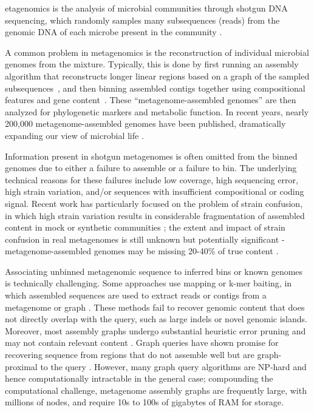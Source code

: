 etagenomics is the analysis of microbial communities through shotgun
DNA sequencing, which randomly samples many subsequences (reads)
from the genomic DNA of each microbe present in the community \cite{Quince2017}.

A common problem in metagenomics is the reconstruction of
individual microbial genomes from the mixture.
Typically, this is
done by first running an assembly algorithm that reconstructs
longer linear regions based on a graph of the sampled
subsequences~\cite{pell2012scaling}, and then binning assembled
contigs together using compositional features and gene content~\cite{laczny2017busybee,lin2016accurate}.  These
``metagenome-assembled genomes'' are then
analyzed for phylogenetic markers and metabolic function. In recent years,
nearly 200,000 metagenome-assembled genomes have been published,
dramatically expanding our view of microbial life
\cite{Parks2017,Tully2018,Stewart2018,Delmont2018,Hug2016,Pasolli2019}.

Information present in shotgun metagenomes is often omitted from the
binned genomes due to either a failure to
assemble \cite{CAMI,Awad155358} or a failure to bin.  The underlying
technical reasons for these failures include low coverage, high
sequencing error, high strain variation, and/or sequences with
insufficient compositional or coding signal.  Recent work has
particularly focused on the problem of strain confusion, in which high
strain variation results in considerable fragmentation of assembled
content in mock or synthetic communities \cite{CAMI,Awad155358}; the
extent and impact of strain confusion in real metagenomes is still
unknown but potentially significant - metagenome-assembled genomes may be missing 20-40\% of true content \cite{brownstrain,Brito2016,baltic}.

Associating unbinned metagenomic sequence to inferred bins or known
genomes is technically challenging.  Some approaches use mapping or
k-mer baiting, in which assembled sequences are used to extract reads
or contigs from a metagenome or
graph \cite{desman,Nayfach2016,ekg,mspminer,Petersen2016}.
These
methods fail to recover genomic content that does not directly overlap
with the query, such as large indels or novel genomic
islands. Moreover, most assembly graphs undergo substantial heuristic
error pruning and may not contain relevant content
\cite{CAMI,Awad155358}.
Graph queries have shown promise for recovering sequence from regions that do
not assemble well but are graph-proximal to the query \cite{metacherchant,perchlorate}. However, many graph query
algorithms are NP-hard and hence computationally intractable in the
general case; compounding the computational challenge, metagenome assembly
graphs are frequently large, with millions of nodes, and require 10s
to 100s of gigabytes of RAM for storage.


